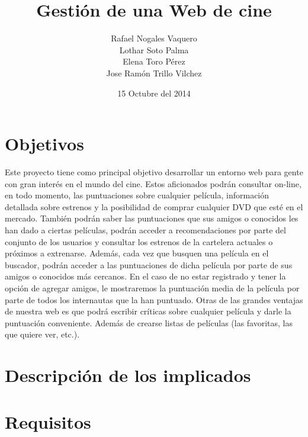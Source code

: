 \documentclass{article}
\title{Gestión de una Web de cine}
\author{Rafael Nogales Vaquero
\\Lothar Soto Palma
\\Elena Toro Pérez
\\Jose Ramón Trillo Vilchez}
\date{15 Octubre del 2014}
\begin{document}
\maketitle

\section{Objetivos}
Este proyecto tiene como principal objetivo desarrollar un entorno web para gente con gran interés en el mundo del cine.
Estos aficionados podrán consultar on-line, en todo momento, las puntuaciones sobre cualquier película, información
detallada sobre estrenos y la posibilidad de comprar cualquier DVD que esté en el mercado.
También podrán saber las puntuaciones que sus amigos o conocidos les han dado a ciertas películas, podrán acceder a
recomendaciones por parte del conjunto de los usuarios y consultar los estrenos de la cartelera actuales o próximos a
extrenarse.
Además, cada vez que busquen una película en el buscador, podrán acceder a las puntuaciones de dicha película por parte de
sus amigos o conocidos más cercanos.
En el caso de no estar registrado y tener la opción de agregar amigos, le mostraremos la puntuación media de la película
por parte de todos los internautas que la han puntuado.
Otras de las grandes ventajas de nuestra web es que podrá escribir críticas sobre cualquier película y darle la puntuación
conveniente. Además de crearse listas de películas (las favoritas, las que quiere ver, etc.).
\section{Descripción de los implicados}

\section{Requisitos}
\end{document}
